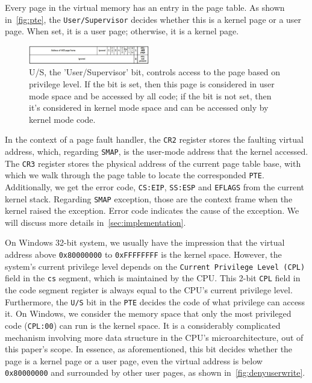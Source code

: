 Every page in the virtual memory has an entry in the page table. As shown in~\autoref{fig:pte}, the \texttt{User/Supervisor} decides whether this is a kernel page or a user page. When set, it is a user page; otherwise, it is a kernel page.

\begin{figure}[th]
  \includegraphics[width=0.47\textwidth]{figures/pte2}
  \centering
  \caption{U/S, the 'User/Supervisor' bit, controls access to the page based on privilege level. If the bit is set, then this page is considered in user mode space and be accessed by all code; if the bit is not set, then it's considered in kernel mode space and can be accessed only by kernel mode code. }
  \label{fig:pte}
\end{figure}



In the context of a page fault handler, the \texttt{CR2} register stores the faulting virtual address, which, regarding \texttt{SMAP}, is the user-mode address that the kernel accessed. The \texttt{CR3} register stores the physical address of the current page table base, with which we walk through the page table to locate the corresponded \texttt{PTE}. Additionally, we get the error code, \texttt{CS:EIP}, \texttt{SS:ESP} and \texttt{EFLAGS} from the  current kernel stack. Regarding \texttt{SMAP} exception, those are the context frame when the kernel raised the exception. Error code indicates the cause of the exception. We will discuss more details in~\autoref{sec:implementation}.


On Windows 32-bit system, we usually have the impression that the virtual address above \texttt{0x80000000} to \texttt{0xFFFFFFFF} is the kernel space. However, the system's current privilege level depends on the \texttt{Current Privilege Level (CPL)} field in the \texttt{cs} segment, which is maintained by the CPU. This 2-bit \texttt{CPL} field in the code segment register is always equal to the CPU's current privilege level. Furthermore, the \texttt{U/S} bit in the \texttt{PTE} decides the code of what privilege can access it. On Windows, we consider the memory space that only the most privileged code (\texttt{CPL:00}) can run is the kernel space. It is a considerably complicated mechanism involving more data structure in the CPU's microarchitecture, out of this paper's scope. In essence, as aforementioned, this bit decides whether the page is a kernel page or a user page, even the virtual address is below \texttt{0x80000000} and surrounded by other user pages, as shown in~\autoref{fig:denyuserwrite}.


